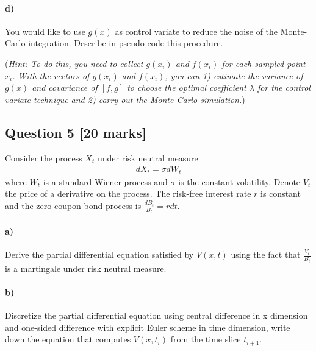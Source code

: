 \documentclass[11pt,a4paper,hidelinks,fleqn]{article}            %
\begin{document}
\paragraph{d)} You would like to use $g(x)$ as control variate to reduce the noise of the Monte-Carlo integration. 
Describe in pseudo code this procedure.

(\emph{Hint: To do this, you need to collect $g(x_i)$ and $f(x_i)$ for each sampled point $x_i$.
With the vectors of $g(x_i)$ and $f(x_i)$, you can 1) estimate the variance of $g(x)$ and covariance of $[f, g]$ to choose the optimal coefficient $\lambda$ for the control variate technique and 2) carry out the Monte-Carlo simulation.})



\subsection*{Question 5 [20 marks]}
Consider the process $X_t$ under risk neutral measure
\begin{align*}
dX_t = \sigma dW_t
\end{align*}
where $W_t$ is a standard Wiener process and $\sigma$ is the constant volatility.
Denote $V_t$ the price of a derivative on the process. The risk-free interest rate $r$ is constant and the zero coupon bond process is $\displaystyle \frac{dB_t}{B_t} = r dt$.

\paragraph{a)} Derive the partial differential equation satisfied by $V(x, t)$ using the fact that $\displaystyle \frac{V_t}{B_t}$ is a martingale under risk neutral measure.

\paragraph{b)} Discretize the partial differential equation using central difference in x dimension and one-sided difference with explicit Euler scheme in time dimension,
write down the equation that computes $V(x, t_i)$ from the time slice $t_{i+1}$.
\end{document}
